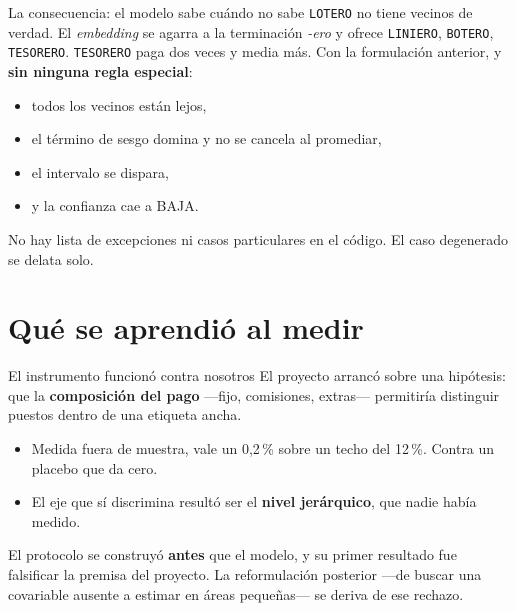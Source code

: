 \documentclass[11pt]{beamer}
\begin{document}
\begin{frame}{La consecuencia: el modelo sabe cuándo no sabe}
\texttt{LOTERO} no tiene vecinos de verdad. El \textit{embedding} se agarra a la
terminación \emph{-ero} y ofrece \texttt{LINIERO}, \texttt{BOTERO},
\texttt{TESORERO}. \texttt{TESORERO} paga dos veces y media más.
\vspace{1em}
Con la formulación anterior, y \textbf{sin ninguna regla especial}:
\begin{itemize}
\item todos los vecinos están lejos,
\item el término de sesgo domina y no se cancela al promediar,
\item el intervalo se dispara,
\item y la confianza cae a BAJA.
\end{itemize}
\vspace{0.8em}
No hay lista de excepciones ni casos particulares en el código. El caso
degenerado se delata solo.
\end{frame}

\section{Qué se aprendió al medir}

\begin{frame}{El instrumento funcionó contra nosotros}
El proyecto arrancó sobre una hipótesis: que la \textbf{composición del pago}
---fijo, comisiones, extras--- permitiría distinguir puestos dentro de una
etiqueta ancha.
\vspace{0.8em}
\begin{itemize}
\item Medida fuera de muestra, vale un \alert{0,2\,\%} sobre un techo del
12\,\%. Contra un placebo que da cero.
\item El eje que sí discrimina resultó ser el \textbf{nivel jerárquico}, que
nadie había medido.
\end{itemize}
\vspace{0.8em}
El protocolo se construyó \textbf{antes} que el modelo, y su primer resultado
fue falsificar la premisa del proyecto. La reformulación posterior ---de buscar
una covariable ausente a estimar en áreas pequeñas--- se deriva de ese rechazo.
\end{frame}
\end{document}

